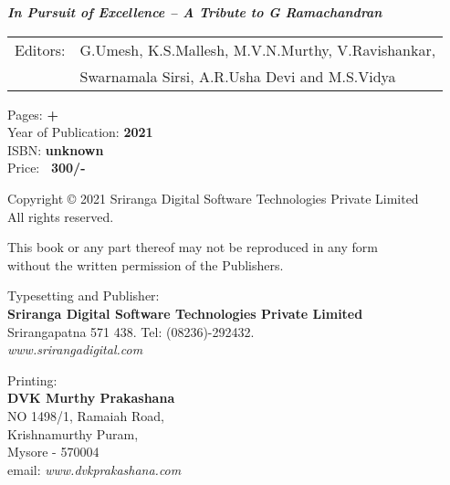 \thispagestyle{empty}
\noindent
{\sl\bfseries In Pursuit of Excellence – A Tribute to  G Ramachandran}
\medskip

\noindent
\begin{tabular}{@{}ll@{}}
Editors: & G.Umesh, K.S.Mallesh, M.V.N.Murthy, V.Ravishankar,\\ 
         & Swarnamala Sirsi, A.R.Usha Devi and M.S.Vidya 
\end{tabular}
\vfill

\noindent
Pages: {\bf \pageref{prelims} + \pageref{bookend}}\\
Year of Publication: {\bf 2021}\\
ISBN: {\bf unknown}\\
Price: {\bf \rupee\ 300/-}
\vfill

\noindent
Copyright © 2021 Sriranga Digital Software Technologies Private Limited\\
All rights reserved.
\vfill

\noindent
This book or any part thereof may not be reproduced in any form\\ without the written permission of the Publishers.
\vfill

\noindent
Typesetting and Publisher:\\
{\bf Sriranga Digital Software Technologies Private Limited}\\ 
Srirangapatna 571 438. Tel: (08236)-292432.\\
{\sl www.srirangadigital.com}\\
\vfill

\noindent
Printing:\\
{\bf DVK Murthy Prakashana}\\
NO 1498/1, Ramaiah Road,\\ 
Krishnamurthy Puram,\\ 
Mysore - 570004\\
email: {\sl www.dvkprakashana.com}
